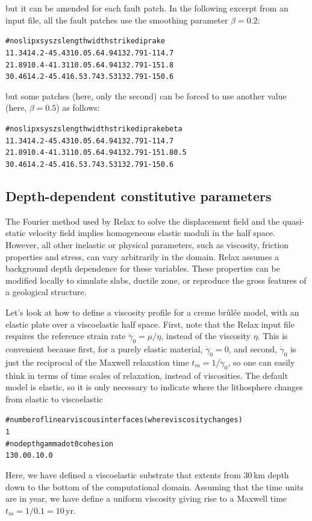 \documentclass[10pt]{article}
\begin{document}
but it can be amended for each fault patch. In the following excerpt from an input file, all the fault patches use the smoothing parameter $\beta=0.2$:
\begin{alltt}
# no slip   xs     ys   zs length width strike dip   rake
   1 1.34 14.2 -45.43 10.0    5.6  4.94  132.7  91 -114.7
   2 1.89 10.4 -41.31 10.0    5.6  4.94  132.7  91 -151.8
   3 0.46 14.2 -45.41  6.5   3.74  3.53  132.7  91 -150.6
\end{alltt}
but some patches (here, only the second) can be forced to use another value (here, $\beta=0.5$) as follows:
\begin{alltt}
# no slip   xs     ys   zs length width strike dip   rake beta
   1 1.34 14.2 -45.43 10.0    5.6  4.94  132.7  91 -114.7
   2 1.89 10.4 -41.31 10.0    5.6  4.94  132.7  91 -151.8  {\color{orange}0.5}
   3 0.46 14.2 -45.41  6.5   3.74  3.53  132.7  91 -150.6
\end{alltt}

\subsection{Depth-dependent constitutive parameters}

The Fourier method used by Relax to solve the displacement field and the quasi-static velocity field implies homogeneous elastic moduli in the half space. However, all other inelastic or physical parameters, such as viscosity, friction properties and stress, can vary arbitrarily in the domain. Relax assumes a background depth dependence for these variables. These properties can be modified locally to simulate slabs, ductile zone, or reproduce the gross features of a geological structure. 

Let's look at how to define a viscosity profile for a creme br\^{u}l\'{e}e model, with an elastic plate over a viscoelastic half space. First, note that the Relax input file requires the reference strain rate $\dot{\gamma}_0=\mu/\eta$, instead of the viscosity $\eta$. This is convenient because first, for a purely elastic material, $\dot{\gamma}_0=0$, and second, $\dot{\gamma}_0$ is just the reciprocal of the Maxwell relaxation time $t_m=1/\dot{\gamma}_0$, so one can easily think in terms of time scales of relaxation, instead of viscosities. The default model is elastic, so it is only necessary to indicate where the lithosphere changes from elastic to viscoelastic
\begin{alltt}
# number of linear viscous interfaces (where viscosity changes)
{\color{orange}1}
# no depth gammadot0 cohesion
{\color{orange}   1  30.0       0.1      0.0}
\end{alltt}
Here, we have defined a viscoelastic substrate that extents from 30\,km depth down to the bottom of the computational domain. Assuming that the time units are in year, we have define a uniform viscosity giving rise to a Maxwell time $t_m=1/0.1=10\,$yr.
\end{document}
